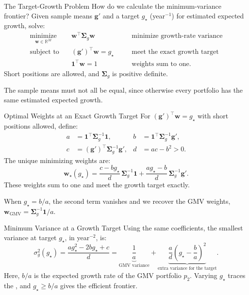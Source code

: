 \documentclass[aspectratio=169,11pt]{beamer}
\newcommand{\bw}{\mathbf{w}}
\newcommand{\bg}{\mathbf{g}}
\newcommand{\bone}{\mathbf{1}}
\newcommand{\Sig}{\boldsymbol{\Sigma}_{g}}
\begin{document}
\begin{frame}{The Target-Growth Problem}
  How do we calculate the minimum-variance frontier? Given sample means
  $\bg'$ and a target $g_\star$ (year$^{-1}$) for estimated expected growth,
  solve:
  \[
    \boxed{
    \begin{aligned}
      \underset{\bw\in\mathbb R^M}{\text{minimize}}\quad
        &\bw^{\top}\Sig\bw
        &&\quad\text{minimize growth-rate variance}\\
      \text{subject to}\quad &(\bg')^{\top}\bw=g_\star
        &&\quad\text{meet the exact growth target}\\
        &\bone^{\top}\bw=1
        &&\quad\text{weights sum to one}.
    \end{aligned}}
  \]
  Short positions are allowed, and $\Sig$ is positive definite.

  \vspace{0.4em}
  The sample means must not all be equal, since otherwise every portfolio
  has the same estimated expected growth.
\end{frame}

\begin{frame}{Optimal Weights at an Exact Growth Target}
  For $(\bg')^{\top}\bw=g_\star$ with short positions allowed, define:
  \[
    \begin{aligned}
      a&=\bone^{\top}\Sig^{-1}\bone,
        & b&=\bone^{\top}\Sig^{-1}\bg',\\[0.3em]
      c&=(\bg')^{\top}\Sig^{-1}\bg',
        & d&=ac-b^2>0.
    \end{aligned}
  \]
  The unique minimizing weights are:
  \[
    \boxed{\bw_\star(g_\star)
      =\frac{c-bg_\star}{d}\,\Sig^{-1}\bone
      +\frac{ag_\star-b}{d}\,\Sig^{-1}\bg'.}
  \]
  These weights sum to one and meet the growth target exactly.

  \vspace{0.4em}
  When $g_\star=b/a$, the second term vanishes and we recover the GMV
  weights, $\bw_{\mathrm{GMV}}=\Sig^{-1}\bone/a$.
\end{frame}

\begin{frame}{Minimum Variance at a Growth Target}
  Using the same coefficients, the smallest variance at target $g_\star$,
  in year$^{-2}$, is:
  \[
    \boxed{\sigma_g^2(g_\star)
      =\frac{a g_\star^2-2b g_\star+c}{d}
      =\underbrace{\frac1a}_{\text{GMV variance}}
      +\underbrace{\frac{a}{d}\left(g_\star-\frac ba\right)^2}_{\text{extra variance for the target}}.}
  \]
  Here, $b/a$ is the expected growth rate of the GMV portfolio $p_2$. Varying
  $g_\star$ traces the , and $g_\star\ge b/a$
  gives the efficient frontier.
\end{frame}
\end{document}

